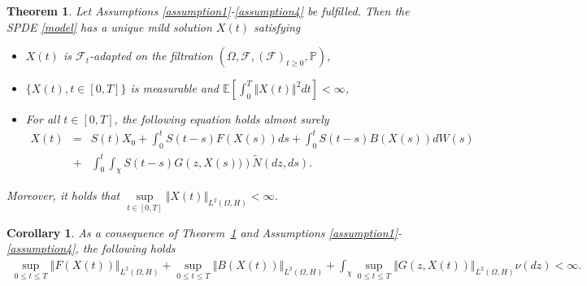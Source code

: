 \documentclass[review,12pt]{elsarticle}
\newtheorem{theorem}{Theorem}[section]
\newtheorem{corollary}{Corollary}[section]
\newcommand{\thmref}[1]{{Theorem~\ref{#1}}}
\begin{document}
\begin{theorem}\cite{Alberverio}
\label{existence}
Let Assumptions \ref{assumption1}-\ref{assumption4} be fulfilled. Then the SPDE \eqref{model} has a unique mild solution $X(t)$ satisfying
\begin{itemize}
\item[(i)] $X(t)$ is $\mathcal{F}_t$-adapted on the filtration $(\Omega, \mathcal{F}, (\mathcal{F})_{t\geq 0}, \mathbb{P})$,
\item[(ii)] $\{X(t), t\in[0, T]\}$ is measurable and $\mathbb{E}\left[\displaystyle\int_0^T\Vert X(t)\Vert^2dt\right]<\infty$,
\item[(iii)] For all $t\in[0, T]$, the following equation holds almost surely
\begin{eqnarray}
\label{mild1}
X(t)&=&S(t)X_0+\int_0^tS(t-s)F\left(X(s)\right)ds+\int_0^tS(t-s)B\left(X(s)\right)dW(s)\nonumber\\
&+&\int_0^t\int_{\chi}S(t-s)G\left(z,X(s))\right)\widetilde{N}(dz,ds).
\end{eqnarray}
\end{itemize}
Moreover, it holds that $\sup\limits_{t\in[0, T]}\Vert X(t)\Vert_{L^2(\Omega, H)}<\infty$.
\end{theorem}

\begin{corollary}
\label{coro1}
As a consequence of \thmref{existence} and Assumptions \ref{assumption1}-\ref{assumption4}, the following  holds
\begin{eqnarray}
\sup_{0\leq t\leq T}\Vert F(X(t))\Vert_{L^2(\Omega, H)}+\sup_{0\leq t\leq T}\Vert B(X(t))\Vert_{L^2(\Omega, H)}+\int_{\chi}\sup_{0\leq t\leq T}\Vert G(z, X(t))\Vert_{L^2(\Omega, H)}\nu(dz)<\infty.
\end{eqnarray}
\end{corollary}
\end{document}
